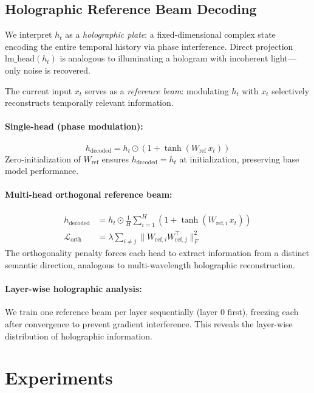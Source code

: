 \documentclass{article}
\begin{document}
\subsection{Holographic Reference Beam Decoding}

We interpret $h_t$ as a \emph{holographic plate}: a fixed-dimensional
complex state encoding the entire temporal history via phase interference.
Direct projection $\text{lm\_head}(h_t)$ is analogous to illuminating
a hologram with incoherent light---only noise is recovered.

The current input $x_t$ serves as a \emph{reference beam}: modulating
$h_t$ with $x_t$ selectively reconstructs temporally relevant information.

\paragraph{Single-head (phase modulation):}
\begin{equation}
  h_\text{decoded} = h_t \odot (1 + \tanh(W_\text{ref}\, x_t))
  \label{eq:holo_single}
\end{equation}
Zero-initialization of $W_\text{ref}$ ensures $h_\text{decoded} = h_t$
at initialization, preserving base model performance.

\paragraph{Multi-head orthogonal reference beam:}
\begin{align}
  h_\text{decoded} &= h_t \odot \frac{1}{H}\sum_{i=1}^{H}
    (1 + \tanh(W_{\text{ref},i}\, x_t)) \\
  \mathcal{L}_\text{orth} &= \lambda \sum_{i \ne j}
    \|W_{\text{ref},i} W_{\text{ref},j}^\top\|_F^2
\end{align}
The orthogonality penalty forces each head to extract information
from a distinct semantic direction, analogous to multi-wavelength
holographic reconstruction.

\paragraph{Layer-wise holographic analysis:}
We train one reference beam per layer sequentially (layer 0 first),
freezing each after convergence to prevent gradient interference.
This reveals the layer-wise distribution of holographic information.

\section{Experiments}
\end{document}
